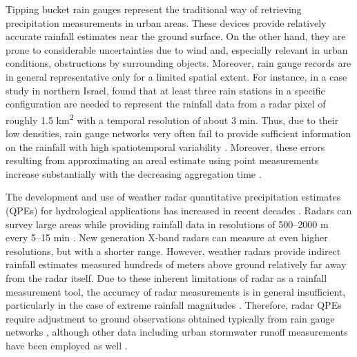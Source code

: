 \documentclass{ctuthesis}\usepackage[]{graphicx}\usepackage[]{color}
\begin{document}
Tipping bucket rain gauges represent the traditional way of retrieving precipitation measurements in urban areas. These devices provide relatively accurate rainfall estimates near the ground surface. On the other hand, they are prone to considerable uncertainties due to wind \citep{nesporEstimationWindInducedError1999} and, especially relevant in urban conditions, obstructions by surrounding objects. Moreover, rain gauge records are in general representative only for a limited spatial extent. For instance, in a case study in northern Israel, \cite{pelegRadarSubpixelscaleRainfall2013} found that at least three rain stations in a specific configuration are needed to represent the rainfall data from a radar pixel of roughly 1.5 km\textsuperscript{2} with a temporal resolution of about 3 min. Thus, due to their low densities, rain gauge networks very often fail to provide sufficient information on the rainfall with high spatiotemporal variability \citep{villariniRainfallSamplingUncertainties2008}. Moreover, these errors resulting from approximating an areal estimate using point measurements increase substantially with the decreasing aggregation time \citep{woodAccuracyRainfallMeasurement2000}.


The development and use of weather radar quantitative precipitation estimates (QPEs) for hydrological applications has increased in recent decades \citep{berneRadarHydrologyUnfulfilled2013, thorndahlWeatherRadarRainfall2017}. Radars can survey large areas while providing rainfall data in resolutions of 500–2000 m every 5–15 min \citep{thorndahlWeatherRadarRainfall2017}. New generation X-band radars \citep[e.g.][]{chenQuantitativePrecipitationEstimation2015, schleissAccuracyWeatherRadar2020} can measure at even higher resolutions, but with a shorter range. However, weather radars provide indirect rainfall estimates measured hundreds of meters above ground relatively far away from the radar itself. Due to these inherent limitations of radar as a rainfall measurement tool, the accuracy of radar measurements is in general insufficient, particularly in the case of extreme rainfall magnitudes \citep{bardossyCombinationRadarDaily2017, thorndahlWeatherRadarRainfall2017}. Therefore, radar QPEs require adjustment to ground observations obtained typically from rain gauge networks \citep{harrisonHighresolutionPrecipitationEstimates2009}, although other data including urban stormwater runoff measurements have been employed as well \citep{ahmWeatherRadarAdjustment2017}.
\end{document}
